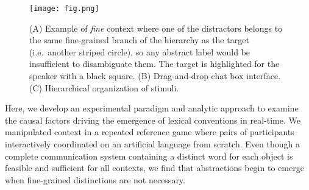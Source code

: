 \begin{figure*}[t]
\begin{center}
{\texttt{[image: fig.png]}}
{\caption{{(A) Example of \emph{fine} context where one of the distractors belongs to the same fine-grained branch of the hierarchy as the target (i.e.\ another striped circle), so any abstract label would be insufficient to disambiguate them. The target is highlighted for the speaker with a black square. (B) Drag-and-drop chat box interface. (C) Hierarchical organization of stimuli.\label{exp}}}}
\vspace{-2ex}
\end{center}
\end{figure*}

Here, we develop an experimental paradigm and analytic approach to examine the causal factors driving the emergence of lexical conventions in real-time. 
We manipulated context in a repeated reference game where pairs of participants interactively coordinated on an artificial language from scratch. %
Even though a complete communication system containing a distinct word for each object is feasible and sufficient for all contexts, we find that abstractions begin to emerge when fine-grained distinctions are not necessary. %





